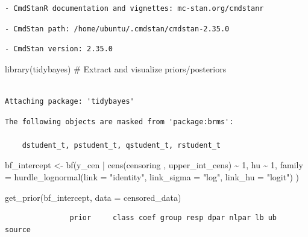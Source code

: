 \documentclass[
]{article}
\newenvironment{Shaded}{\begin{snugshade}}{\end{snugshade}}
\newcommand{\AttributeTok}[1]{\textcolor[rgb]{0.40,0.45,0.13}{#1}}
\newcommand{\CommentTok}[1]{\textcolor[rgb]{0.37,0.37,0.37}{#1}}
\newcommand{\DecValTok}[1]{\textcolor[rgb]{0.68,0.00,0.00}{#1}}
\newcommand{\FunctionTok}[1]{\textcolor[rgb]{0.28,0.35,0.67}{#1}}
\newcommand{\NormalTok}[1]{\textcolor[rgb]{0.00,0.23,0.31}{#1}}
\newcommand{\OtherTok}[1]{\textcolor[rgb]{0.00,0.23,0.31}{#1}}
\newcommand{\SpecialCharTok}[1]{\textcolor[rgb]{0.37,0.37,0.37}{#1}}
\newcommand{\StringTok}[1]{\textcolor[rgb]{0.13,0.47,0.30}{#1}}
\begin{document}
\begin{verbatim}
- CmdStanR documentation and vignettes: mc-stan.org/cmdstanr
\end{verbatim}

\begin{verbatim}
- CmdStan path: /home/ubuntu/.cmdstan/cmdstan-2.35.0
\end{verbatim}

\begin{verbatim}
- CmdStan version: 2.35.0
\end{verbatim}

\begin{Shaded}
\begin{Highlighting}[]
\FunctionTok{library}\NormalTok{(tidybayes)  }\CommentTok{\# Extract and visualize priors/posteriors }
\end{Highlighting}
\end{Shaded}

\begin{verbatim}

Attaching package: 'tidybayes'
\end{verbatim}

\begin{verbatim}
The following objects are masked from 'package:brms':

    dstudent_t, pstudent_t, qstudent_t, rstudent_t
\end{verbatim}

\begin{Shaded}
\begin{Highlighting}[]
\NormalTok{bf\_intercept }\OtherTok{\textless{}{-}} \FunctionTok{bf}\NormalTok{(y\_cen }\SpecialCharTok{|} \FunctionTok{cens}\NormalTok{(censoring , upper\_int\_cens) }\SpecialCharTok{\textasciitilde{}} \DecValTok{1}\NormalTok{, }
\NormalTok{                                  hu }\SpecialCharTok{\textasciitilde{}} \DecValTok{1}\NormalTok{, }
                           \AttributeTok{family =} \FunctionTok{hurdle\_lognormal}\NormalTok{(}\AttributeTok{link =} \StringTok{"identity"}\NormalTok{, }\AttributeTok{link\_sigma =} \StringTok{"log"}\NormalTok{, }\AttributeTok{link\_hu =} \StringTok{"logit"}\NormalTok{)}
\NormalTok{)}

\FunctionTok{get\_prior}\NormalTok{(bf\_intercept, }\AttributeTok{data =}\NormalTok{ censored\_data)}
\end{Highlighting}
\end{Shaded}

\begin{verbatim}
               prior     class coef group resp dpar nlpar lb ub  source
\end{verbatim}
\end{document}
